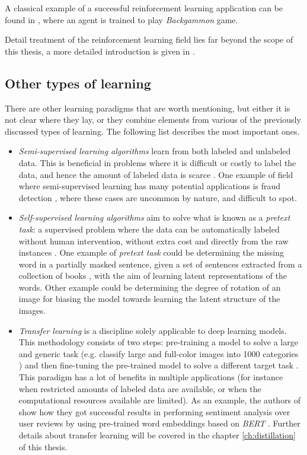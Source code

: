 A classical example of a successful reinforcement learning application can be found in \autocite{tesauro1994}, where an agent is trained to play \textit{Backgammon} game.

Detail treatment of the reinforcement learning field lies far beyond the scope of this thesis, a more detailed introduction is given in \autocite{sutton2018, szepesvari2010}.

\subsection{Other types of learning} \label{sec:typesoflearning_others}
There are other learning paradigms \autocite{raghu2020} that are worth mentioning, but either it is not clear where they lay, or they combine elements from various of the previously discussed types of learning. The following list describes the most important ones.
\begin{itemize}
	\item \textit{Semi-supervised learning algorithms} learn from both labeled and unlabeled data. This is beneficial in problems where it is difficult or costly to label the data, and hence the amount of labeled data is scarce \autocite{raghu2020}. One example of field where semi-supervised learning has many potential applications is fraud detection \autocite{wang2020b}, where these cases are uncommon by nature, and difficult to spot.
	\item \textit{Self-supervised learning algorithms} aim to solve what is known as a \textit{pretext task}: a supervised problem where the data can be automatically labeled without human intervention, without extra cost and directly from the raw instances \autocite{raghu2020}. One example of \textit{pretext task} could be determining the missing word in a partially masked sentence, given a set of sentences extracted from a collection of books \autocite{devlin2019}, with the aim of learning latent representations of the words. Other example could be determining the degree of rotation of an image \autocite{gidaris2018} for biasing the model towards learning the latent structure of the images.
	\item \textit{Transfer learning} is a discipline solely applicable to deep learning models. This methodology consists of two steps: pre-training a model to solve a large and generic task (e.g. classify large and full-color images into 1000 categories \autocite{deng2009imagenet}) and then fine-tuning the pre-trained model to solve a different target task \autocite{raghu2020}. This paradigm has a lot of benefits in multiple applications (for instance when restricted amounts of labeled data are available, or when the computational resources available are limited). As an example, the authors of \autocite{souza2022} show how they got successful results in performing sentiment analysis over user reviews by using pre-trained word embeddings based on \textit{BERT} \autocite{devlin2019}. Further details about transfer learning will be covered in the chapter \ref{ch:distillation} of this thesis.
\end{itemize}


